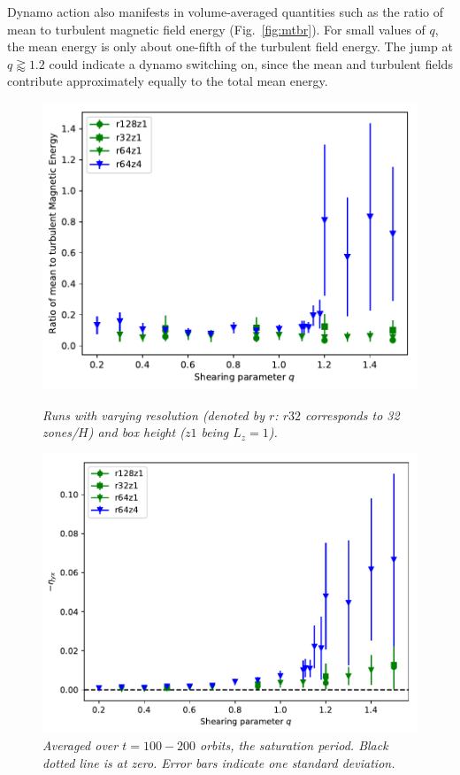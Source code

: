 \documentclass{epsconf}
\begin{document}
Dynamo action also manifests in volume-averaged quantities such as the ratio of mean to turbulent magnetic field energy (Fig.~\ref{fig:mtbr}). For small values of $q$, the mean energy is only about one-fifth of the turbulent field energy. The jump at $q\gtrapprox1.2$ could indicate a dynamo switching on, since the mean and turbulent fields contribute approximately equally to the total mean energy.
\begin{figure}[h]
\vspace{0cm}
\begin{minipage}{0.48\textwidth}
    \centering
    \includegraphics[width=\linewidth]{fig_vata_mtT_MEmtr_err.pdf}
    \caption{\it \small Runs with varying resolution (denoted by $r$: $r32$ corresponds to 32 zones/$H$) and box height ($z1$ being $L_z=1$).}
    \label{fig:mtbr}
\end{minipage}%
\hfill%
 \begin{minipage}{.48\textwidth}
  \centering
    \includegraphics[width=\linewidth]{fig_vataqe_etayx_const_t100-end_hgbLAIF_err.pdf}
    \caption{\it \small Averaged over $t=100-200$ orbits, the saturation period. Black dotted line is at zero. Error bars indicate one standard deviation. }
    \label{fig:etayx}
\end{minipage}
\vspace{0cm}
\end{figure}
\end{document}
